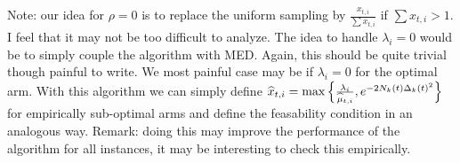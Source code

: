 Note: our idea for $\rho=0$ is to replace the uniform sampling by $\frac{x_{t,i}}{\sum x_{t,i}}$ if $\sum x_{t,i}>1$. I feel that it may not be too difficult to analyze. The idea to handle $\lambda_i=0$ would be to simply couple the algorithm with MED. Again, this should be quite trivial though painful to write. We most painful case may be if $\lambda_i=0$ for the optimal arm. With this algorithm we can simply define $\widehat{x}_{t,i}=\max\left\{\frac{\lambda_i}{\widehat{\mu}_{t,i}}, e^{-2N_k(t)\Delta_k(t)^2} \right\}$ for empirically sub-optimal arms and define the feasability condition in an analogous way. Remark: doing this may improve the performance of the algorithm for all instances, it may be interesting to check this empirically.








